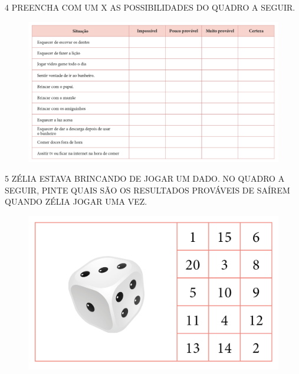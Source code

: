 \pagebreak
\num{4} PREENCHA COM UM X AS POSSIBILIDADES DO QUADRO A SEGUIR.

\begin{figure}[htpb!]
\includegraphics[width=\textwidth]{./media/SAEB_1ANO_MAT_FIGURA87.png}
\end{figure}


\num{5} ZÉLIA ESTAVA BRINCANDO DE JOGAR UM DADO. NO QUADRO A SEGUIR, PINTE QUAIS SÃO
OS RESULTADOS PROVÁVEIS DE SAÍREM QUANDO ZÉLIA JOGAR UMA VEZ.

\begin{figure}[htpb!]
\centering
\includegraphics[width=.7\textwidth]{./media/SAEB_1ANO_MAT_FIGURA88.png}
\end{figure}


